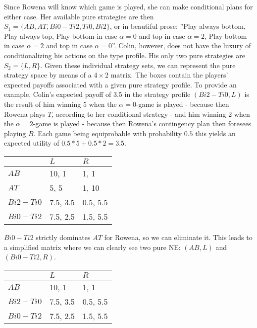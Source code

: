 \documentclass[10pt,a4paper]{article}
\begin{document}
Since Rowena will know which game is played, she can make conditional plans for either case. Her available pure strategies are then $S_1=\{AB,AT,Bi0-Ti2,Ti0,Bi2\}$, or in beautiful prose: ''Play always bottom, Play always top, Play bottom in case $\alpha=0$ and top in case $\alpha=2$, Play bottom in case $\alpha=2$ and top in case $\alpha=0$''. Colin, however, does not have the luxury of conditionalizing his actions on the type profile. His only two pure strategies are $S_2=\{L,R\}$. Given these individual strategy sets, we can represent the pure strategy space by means of a $4\times 2$ matrix. The boxes contain the players' expected payoffs associated with a given pure strategy profile. To provide an example, Colin's expected payoff of $3.5$ in the strategy profile $(Bi2-Ti0,L)$ is the result of him winning $5$ when the $\alpha=0$-game is played - because then Rowena plays $T$, according to her conditional strategy - and him winning $2$ when the $\alpha=2$-game is played - because then Rowena's contingency plan then foresees playing $B$. Each game being equiprobable with probability $0.5$ this yields an expected utility of $0.5*5+0.5*2=3.5$.
\begin{table}[h]
\centering
\begin{tabular}[l]{|l|l|l|}
\hline
          & $L$ & $R$  \\ \hline
$AB$     & 10, 1   & 1, 1 \\ \hline
$AT$		& 5, 5	& 1, 10 \\ \hline
$Bi2-Ti0$	& 7.5, 3.5 & 0.5, 5.5 \\ \hline
$Bi0-Ti2$	& 7.5, 2.5	& 1.5, 5.5 \\ \hline
\end{tabular}
\end{table}
$Bi0-Ti2$ strictly dominates $AT$ for Rowena, so we can eliminate it. This leads to a simplified matrix where we can clearly see two pure NE: $(AB,L)$ and $(Bi0-Ti2,R)$.
\begin{table}[h]
\centering
\begin{tabular}[l]{|l|l|l|}
\hline
          & $L$ & $R$  \\ \hline
$AB$     & 10, 1   & 1, 1 \\ \hline
$Bi2-Ti0$	& 7.5, 3.5 & 0.5, 5.5 \\ \hline
$Bi0-Ti2$	& 7.5, 2.5	& 1.5, 5.5 \\ \hline
\end{tabular}
\end{table}
\end{document}
